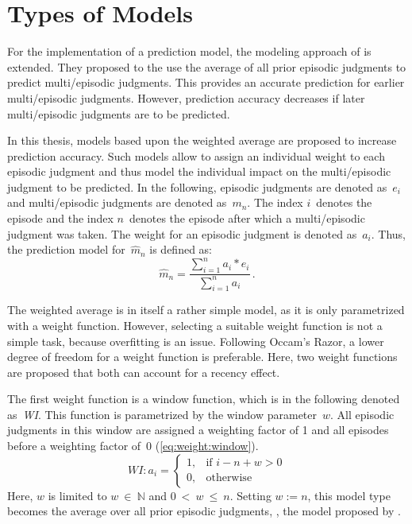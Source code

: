 \section{Types of Models}
For the implementation of a prediction model, the modeling approach of \citet{moller_single-call_2011} is extended.
They proposed to the use the average of all prior episodic judgments to predict multi\-/episodic judgments.
This provides an accurate prediction for earlier multi\-/episodic judgments.
However, prediction accuracy decreases if later multi\-/episodic judgments are to be predicted.

In this thesis, models based upon the weighted average are proposed to increase prediction accuracy.
Such models allow to assign an individual weight to each episodic judgment and thus model the individual impact on the multi\-/episodic judgment to be predicted.
In the following, episodic judgments are denoted as~$\mathit{e_i}$ and multi\-/episodic judgments are denoted as~$\mathit{m_n}$.
The index $\mathit{i}$~denotes the episode and the index $\mathit{n}$~denotes the episode after which a multi\-/episodic judgment was taken.
The weight for an episodic judgment is denoted as~$\mathit{a_i}$.
Thus, the prediction model for~$\mathit{\hat{m}_n}$ is defined as: 
\begin{equation}\label{eq:average}
\hat{m}_n=\frac{\sum\limits_{i=1}^{n}a_i*e_i}{\sum\limits_{i=1}^{n}a_i} \, .
\end{equation}

The weighted average is in itself a rather simple model, as it is only parametrized with a weight function.
However, selecting a suitable weight function is not a simple task, because overfitting is an issue.
Following Occam's Razor, a lower degree of freedom for a weight function is preferable.
Here, two weight functions are proposed that both can account for a recency effect.

The first weight function is a window function, which is in the following denoted as~\emph{WI}.
This function is parametrized by the window parameter~$\mathit{w}$.
All episodic judgments in this window are assigned a weighting factor of 1 and all episodes before a weighting factor of~0 (\autoref{eq:weight:window}).
\begin{equation}\label{eq:weight:window}
WI: a_i= \left\{
\begin{array}{ll}
  1,& \text{if } i - n + w > 0 \\
  0,& \text{otherwise}
\end{array}
\right.
\end{equation}
Here, $\mathit{w}$ is limited to $\mathit{w}~\in~\mathbb{N}$ and $0~<~\mathit{w}~\leq~\mathit{n}$.
Setting $\mathit{w := n}$, this model type becomes the average over all prior episodic judgments, \ie, the model proposed by \citet{moller_single-call_2011}.

